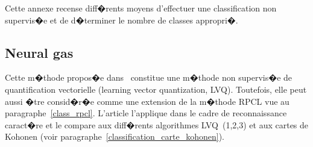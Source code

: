 
\firstpassagedo{}

\firstpassagedo{}


Cette annexe recense diff�rents moyens d'effectuer une classification non supervis�e et de d�terminer le nombre de classes appropri�.

\label{classification_non_supervisee}













\subsection{Neural gas}



Cette m�thode propos�e dans~ constitue une m�thode non supervis�e de quantification vectorielle (learning vector quantization, LVQ). Toutefois, elle peut aussi �tre consid�r�e comme une extension de la m�thode RPCL vue au paragraphe~\ref{class_rpcl}. L'article  l'applique dans le cadre de reconnaissance caract�re et le compare aux diff�rents algorithmes LVQ~(1,2,3) et aux cartes de Kohonen (voir paragraphe~\ref{classification_carte_kohonen}).



